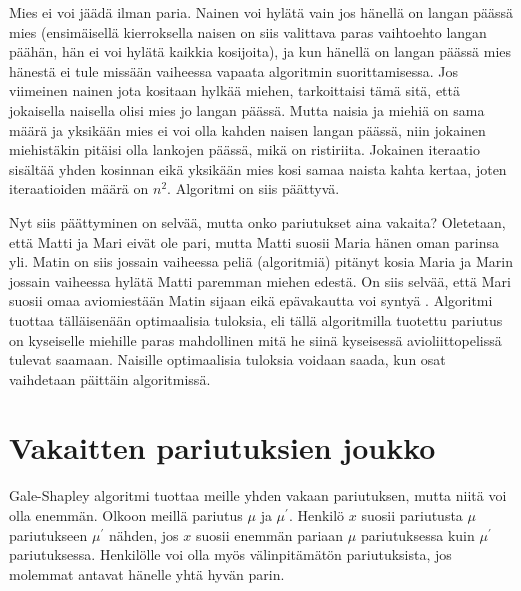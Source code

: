 \documentclass[finnish]{tktltiki2}
\theoremstyle{definition}
\theoremstyle{remark}
\begin{document}
Mies ei voi jäädä ilman paria. Nainen voi hylätä vain jos hänellä on langan päässä mies (ensimäisellä kierroksella naisen on siis valittava paras vaihtoehto langan päähän, hän ei voi hylätä kaikkia kosijoita), ja kun hänellä on langan päässä mies hänestä ei tule missään vaiheessa vapaata algoritmin suorittamisessa.
Jos viimeinen nainen jota kositaan hylkää miehen, tarkoittaisi tämä sitä, että jokaisella naisella olisi mies jo langan päässä. Mutta naisia ja miehiä on sama määrä ja yksikään mies ei voi olla kahden naisen langan päässä, niin jokainen miehistäkin pitäisi olla lankojen päässä, mikä on ristiriita.
Jokainen iteraatio sisältää yhden kosinnan eikä yksikään mies kosi samaa naista kahta kertaa, joten iteraatioiden määrä on $n^2$. Algoritmi on siis päättyvä.

Nyt siis päättyminen on selvää, mutta onko pariutukset aina vakaita?
Oletetaan, että Matti ja Mari eivät ole pari, mutta Matti suosii Maria hänen oman parinsa yli. Matin on siis jossain vaiheessa peliä (algoritmiä) pitänyt kosia Maria ja Marin jossain vaiheessa hylätä Matti paremman miehen edestä. On siis selvää, että Mari suosii omaa aviomiestään Matin sijaan eikä epävakautta voi syntyä \cite[p. 588]{gale62a}.
Algoritmi tuottaa tälläisenään optimaalisia tuloksia, eli tällä algoritmilla tuotettu pariutus on kyseiselle miehille paras mahdollinen mitä he siinä kyseisessä avioliittopelissä tulevat saamaan.
Naisille optimaalisia tuloksia voidaan saada, kun osat vaihdetaan päittäin algoritmissä.

\section{Vakaitten pariutuksien joukko}
Gale-Shapley algoritmi tuottaa meille yhden vakaan pariutuksen, mutta niitä voi olla enemmän.
Olkoon meillä pariutus $\mu$ ja $\mu^{'}$. Henkilö $x$ suosii pariutusta $\mu$ pariutukseen $\mu^{'}$ nähden, jos $x$ suosii enemmän pariaan $\mu$ pariutuksessa kuin $\mu^{'}$ pariutuksessa. Henkilölle voi olla myös välinpitämätön pariutuksista, jos molemmat antavat hänelle yhtä hyvän parin.
\end{document}
